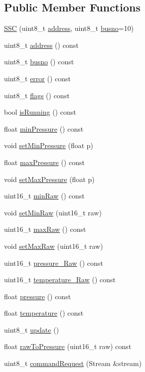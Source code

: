 \subsection*{Public Member Functions}
\begin{DoxyCompactItemize}
\item 
\hyperlink{class_s_s_c_a461deb0de60c249716862705835c7c24}{S\+SC} (uint8\+\_\+t \hyperlink{class_s_s_c_ac6607ee7e74a8c7430406123025c2ac0}{address}, uint8\+\_\+t \hyperlink{class_s_s_c_aaffcf87d61d2b2c2f7044bceaa00321c}{busno}=10)
\item 
uint8\+\_\+t \hyperlink{class_s_s_c_ac6607ee7e74a8c7430406123025c2ac0}{address} () const
\item 
uint8\+\_\+t \hyperlink{class_s_s_c_aaffcf87d61d2b2c2f7044bceaa00321c}{busno} () const
\item 
uint8\+\_\+t \hyperlink{class_s_s_c_a7ea76d501c90ac1c87cd6b1d87f988b1}{error} () const
\item 
uint8\+\_\+t \hyperlink{class_s_s_c_afabea8e8e41af4842e5b4621cb4ce5f2}{flags} () const
\item 
bool \hyperlink{class_s_s_c_a13b6cd9dec0ef74674bcb48ba07119db}{is\+Running} () const
\item 
float \hyperlink{class_s_s_c_a5e83c12a55310a65b957e751fdf09e31}{min\+Pressure} () const
\item 
void \hyperlink{class_s_s_c_ae1ab726d6219249a87f7c9b38ed9f692}{set\+Min\+Pressure} (float p)
\item 
float \hyperlink{class_s_s_c_a4e6e3ab38e6ce15291404abe00b5d5bc}{max\+Pressure} () const
\item 
void \hyperlink{class_s_s_c_afe7cb953b1ce7f8022742eb0ae423c3e}{set\+Max\+Pressure} (float p)
\item 
uint16\+\_\+t \hyperlink{class_s_s_c_a2f69b84fd3069cae254957fafbd6e985}{min\+Raw} () const
\item 
void \hyperlink{class_s_s_c_af0ecf4b003d5cbcfd896a508ae5652e7}{set\+Min\+Raw} (uint16\+\_\+t raw)
\item 
uint16\+\_\+t \hyperlink{class_s_s_c_a930725a21edf40efe0b2dc3dadc45368}{max\+Raw} () const
\item 
void \hyperlink{class_s_s_c_a7c6826aa29cc53654576162ec01fd876}{set\+Max\+Raw} (uint16\+\_\+t raw)
\item 
uint16\+\_\+t \hyperlink{class_s_s_c_a4b550f846ca3da41992221ad40b6cff7}{pressure\+\_\+\+Raw} () const
\item 
uint16\+\_\+t \hyperlink{class_s_s_c_a957056a2bd3932ca7a812af8f41f0718}{temperature\+\_\+\+Raw} () const
\item 
float \hyperlink{class_s_s_c_a3022b28fa8fd9bbeb5f9130f7d624dcb}{pressure} () const
\item 
float \hyperlink{class_s_s_c_a30d005252723ae8ad7aa6806677172e1}{temperature} () const
\item 
uint8\+\_\+t \hyperlink{class_s_s_c_a4eb4e0d9d5f45fd3f37cf0e22c894117}{update} ()
\item 
float \hyperlink{class_s_s_c_ab595efde0ee85f72c474730b204c3acd}{raw\+To\+Pressure} (uint16\+\_\+t raw) const
\item 
uint8\+\_\+t \hyperlink{class_s_s_c_a6f3c30c9365fb70be3128dd8e7b372be}{command\+Request} (Stream \&stream)
\end{DoxyCompactItemize}
